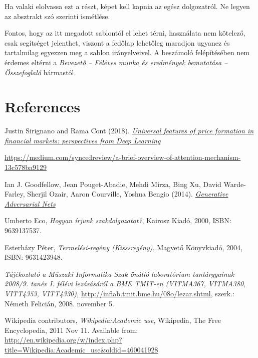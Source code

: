 \documentclass[11pt,a4paper,oneside]{article}
\begin{document}
Ha valaki elolvassa ezt a részt, képet kell kapnia az egész
dolgozatról.  Ne legyen az absztrakt szó szerinti ismétlése.

Fontos, hogy az itt megadott sablontól el lehet térni, használata nem
kötelező, csak segítséget jelenthet, viszont a fedőlap lehetőleg
maradjon ugyanez és tartalmilag egyezzen meg a sablon irányelveivel. A
beszámoló felépítésében nem érdemes eltérni a \emph{Bevezető --
  Féléves munka és eredmények bemutatása -- Összefoglaló} hármastól.

\newpage
 
\section{References}
\label{sec:irod-es-csatl}

\begin{references}{9}
\label{sec:tanulm-irod-jegyz}

 Justin Sirignano and Rama Cont (2018). \emph{
\href{https://arxiv.org/abs/1803.06917.pdf}{Universal features of price formation in financial markets: perspectives from Deep Learning}}

 \url{https://medium.com/syncedreview/a-brief-overview-of-attention-mechanism-13c578ba9129}

 Ian J. Goodfellow, Jean Pouget-Abadie, Mehdi Mirza, Bing Xu, David Warde-Farley, Sherjil Ozair, Aaron Courville, Yoshua Bengio (2014). \emph{
\href{http://papers.nips.cc/paper/5423-generative-adversarial-nets.pdf}{Generative Adversarial Nets}}

 Umberto Eco, \emph{Hogyan írjunk szakdolgozatot?},
  Kairosz Kiadó, 2000, ISBN: 9639137537.

 Esterházy Péter, \emph{Termelési-regény (Kisssregény),}
  Magvető Könyvkiadó, 2004, ISBN: 9631423948.

 \emph{Tájékoztató a Műszaki Informatika Szak önálló
    laboratórium tantárgyainak 2008/9. tanév I. félévi lezárásáról a
    BME TMIT-en (VITMA367, VITMA380, VITT4353, VITT4330),}
  \url{http://inflab.tmit.bme.hu/08o/lezar.shtml}, szerk.: Németh Felicián,
  2008. november 5.

 Wikipedia contributors, \emph{Wikipedia:Academic
    use}, Wikipedia, The Free Encyclopedia, 2011 Nov 11.  Available
  from: \\ \url{http://en.wikipedia.org/w/index.php?title=Wikipedia:Academic\_use\&oldid=460041928}

\end{references}
\end{document}

